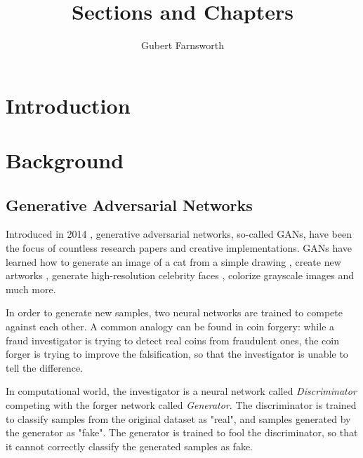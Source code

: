 \documentclass{article}
\title{Sections and Chapters}
\author{Gubert Farnsworth}
\date{ }
\begin{document}
\maketitle
\tableofcontents

\newpage

\section{Introduction}

\section{Background}

\pagebreak
\subsection{Generative Adversarial Networks}

Introduced in 2014 \cite{goodfellow_generative_2014}, generative adversarial  networks, so-called GANs, have been the focus of countless research papers and creative implementations. GANs have learned how to generate an image of a cat from a simple drawing \cite{hesse_image--image_nodate}, create new artworks \cite{rkjones4_gangogh_2018}, generate high-resolution celebrity faces \cite{karras_progressive_2017}, colorize grayscale images and much more.

In order to generate new samples, two neural networks are trained to compete against each other. A common analogy can be found in coin forgery: while a fraud investigator is trying to detect real coins from fraudulent ones, the coin forger is trying to improve the falsification, so that the investigator is unable to tell the difference.

In computational world, the investigator is a neural network called \textit{Discriminator} competing with the forger network called \textit{Generator}. The discriminator is trained to classify samples from the original dataset as "real", and samples generated by the generator as "fake". The generator is trained to fool the discriminator, so that it cannot correctly classify the generated samples as fake.
\end{document}
